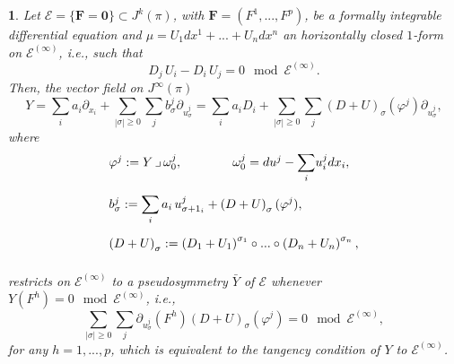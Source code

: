 \documentclass[10pt,a4paper]{amsart}
\newtheorem{prop}{}
\begin{document}
\begin{prop}
\label{prop:pseudoE}%
Let $\mathcal{E}=\{\mathbf{F=0}\}\subset J^{k}(\pi )$, with
$\text{$\mathbf{F}$}=(F^{1},...,F^{p})$, be a formally integrable
differential equation and $\mu =U_{1}dx^{1}+...+U_{n}dx^{n}$ an horizontally
closed $1$-form on $\mathcal{E}^{(\infty )}$, i.e., such that
%
\begin{equation}
D_{j}\,U_{i}-D_{i}\,U_{j}=0\mod{\mathcal{E}^{(\infty )}}.
\label{eq:U_psym}
\end{equation}
%
Then, the vector field on $J^{\infty}(\pi )$
%
\begin{equation}
Y=\sum _{i}a_{i}\partial _{x_{i}}+\sum _{|\sigma |\geq 0}\sum _{j}b_{
\sigma}^{j}\partial _{u_{\sigma}^{j}}=\sum _{i}a_{i}D_{i}+\sum _{|
\sigma |\geq 0}\sum _{j}\left (D+U\right )_{\sigma}(\varphi ^{j})
\partial _{u_{\sigma}^{j}},
\label{eq:Y_pseudo_int}
\end{equation}
%
where
%
\begin{equation*}
%
\begin{array}{l}
\varphi ^{j}:=Y\,\lrcorner \,\omega _{0}^{j},\qquad \qquad \omega _{0}^{j}=du^{j}-{
\displaystyle \sum _{i}}u_{i}^{j}dx_{i},
\vspace{10pt}
\\
b_{\sigma}^{j}:={\displaystyle \sum _{i}a_{i}\,u_{\sigma +1_{i}}^{j}+
\left (D+U\right )_{\sigma}(\varphi ^{j})},
\vspace{10pt}
\\
\left (D+U\right )_{\sigma}:=\left (D_{1}+U_{1}\right )^{\sigma _{1}}
\circ ...\circ \left (D_{n}+U_{n}\right )^{\sigma _{n}},
\vspace{10pt}
\end{array}
%
\end{equation*}
%
restricts on $\mathcal{E}^{(\infty )}$ to a pseudosymmetry $\bar{Y}$ of
$\mathcal{E}$ whenever $Y(F^{h})=0\mod{\mathcal{E}^{(\infty )}}$, i.e.,
%
\begin{equation}
\sum _{|\sigma |\geq 0}\sum _{j}\partial _{u_{\sigma}^{j}}\left (F^{h}
\right )\left (D+U\right )_{\sigma}(\varphi ^{j})=0
\mod{\mathcal{E}^{(\infty )}},
\label{eq:Y_tang}
\end{equation}
%
for any $h=1,...,p$, which is equivalent to the tangency condition of
$Y$ to $\mathcal{E}^{(\infty )}$.
\end{prop}
\end{document}
